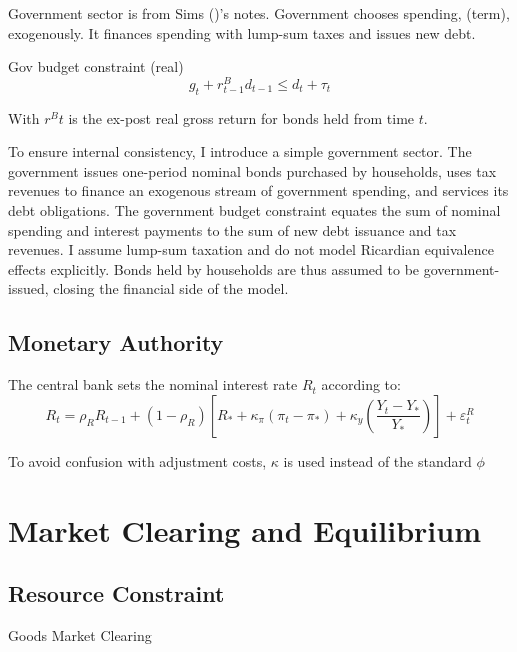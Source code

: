 \documentclass[11pt,preprint]{elsarticle}
\numberwithin{equation}{section}
\numberwithin{figure}{section}
\numberwithin{table}{section}
\begin{document}
Government sector is from Sims ()'s
notes. Government chooses spending, (term), exogenously. It finances
spending with lump-sum taxes and issues new debt.

Gov budget constraint (real) \begin{equation}
g_t + r^B_{t-1} d_{t-1} \leq d_t + \tau_t \label{Gov_Budget}
\end{equation}

With \(r^Bt\) is the ex-post real gross return for bonds held from time
\(t\).

To ensure internal consistency, I introduce a simple government sector.
The government issues one-period nominal bonds purchased by households,
uses tax revenues to finance an exogenous stream of government spending,
and services its debt obligations. The government budget constraint
equates the sum of nominal spending and interest payments to the sum of
new debt issuance and tax revenues. I assume lump-sum taxation and do
not model Ricardian equivalence effects explicitly. Bonds held by
households are thus assumed to be government-issued, closing the
financial side of the model.

\subsection{Monetary Authority}\label{monetary-authority}

The central bank sets the nominal interest rate \(R_t\) according to:\\
\begin{equation}
R_t = \rho_R R_{t-1} + (1 - \rho_R) \left[ R_* + \kappa_\pi (\pi_t - \pi_*) + \kappa_y \left( \frac{Y_t - Y_*}{Y_*} \right) \right] + \varepsilon_t^R
\label{taylor_rule}
\end{equation}

To avoid confusion with adjustment costs, \(\kappa\) is used instead of
the standard \(\phi\)

\section{Market Clearing and
Equilibrium}\label{market-clearing-and-equilibrium}

\subsection{Resource Constraint}\label{resource-constraint}

Goods Market Clearing
\end{document}
